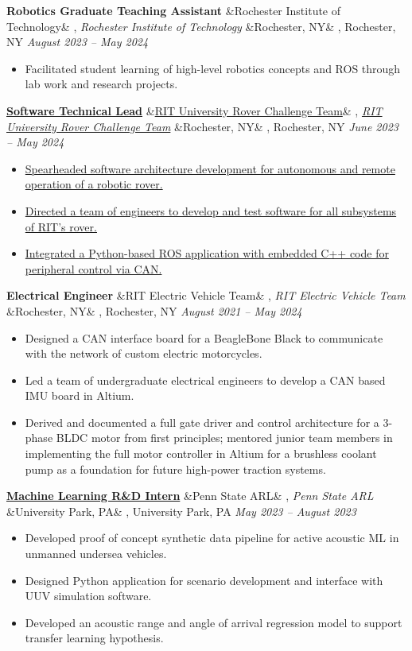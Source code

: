 \documentclass[letterpaper,10pt]{article}
\newcommand{\experience}[5]{%
    \vspace{-1mm}%
    \noindent\textbf{#1}%
    \ifx&#2&
    \else
        , \textit{#2}%
    \fi
    \ifx&#3&
    \else
        , #3%
    \fi
    \hfill \textit{#4} \\
    \vspace{-6.8mm}%
    \begin{itemize}[itemsep=-5pt]
        \setlength{\itemindent}{0em}
        #5
    \end{itemize}
}
\begin{document}
\experience
    {Robotics Graduate Teaching Assistant}
    {Rochester Institute of Technology}
    {Rochester, NY}
    {August 2023 – May 2024}
    {
        \item  Facilitated student learning of high-level robotics concepts and ROS through lab work and research projects.
    }

\experience
    {\href{https://github.com/ryan-barry-99/rovers}{Software Technical Lead}}
    {\href{https://github.com/ryan-barry-99/rovers}{RIT University Rover Challenge Team}}
    {Rochester, NY}
    {June 2023 – May 2024}
    {
        \item \href{https://github.com/ryan-barry-99/rovers}{Spearheaded software architecture development for autonomous and remote operation of a robotic rover.}

        \item \href{https://github.com/ryan-barry-99/rovers}{Directed a team of engineers to develop and test software for all subsystems of RIT’s rover.}

        \item \href{https://github.com/ryan-barry-99/rovers}{Integrated a Python-based ROS application with embedded C++ code for peripheral control via CAN.}
    }

\experience
    {Electrical Engineer}
    {RIT Electric Vehicle Team}
    {Rochester, NY}
    {August 2021 – May 2024}
    {
        \item Designed a CAN interface board for a BeagleBone Black to communicate with the network of custom electric motorcycles.
        \item Led a team of undergraduate electrical engineers to develop a CAN based IMU board in Altium. 
        \item Derived and documented a full gate driver and control architecture for a 3-phase BLDC motor from first principles; mentored junior team members in implementing the full motor controller in Altium for a brushless coolant pump as a foundation for future high-power traction systems.

    }

\experience
    {\href{https://ryanbarry.me/projects/ai-ml/sonar-data-pipeline/}{Machine Learning R\&D Intern}}
    {Penn State ARL}
    {University Park, PA}
    {May 2023 – August 2023}
    {
        \item Developed proof of concept synthetic data pipeline for active acoustic ML in unmanned undersea vehicles.

        \item Designed Python application for scenario development and interface with UUV simulation software.

        \item Developed an acoustic range and angle of arrival regression model to support transfer learning hypothesis.
    }
\end{document}
